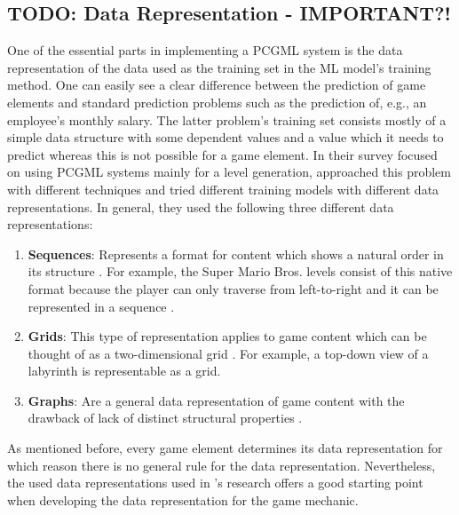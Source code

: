 \documentclass[MGS,Master,english]{twbook}%
\begin{document}
\subsection{TODO: Data Representation - IMPORTANT?!}
{\color{blue}One of the essential parts in implementing a PCGML system is the data representation of the data used as the training set in the ML model's training method. One can easily see a clear difference between the prediction of game elements and standard prediction problems such as the prediction of, e.g., an employee's monthly salary. The latter problem’s training set consists mostly of a simple data structure with some dependent values and a value which it needs to predict whereas this is not possible for a game element. In their survey focused on using PCGML systems mainly for a level generation, \citep{pcgml::paper} approached this problem with different techniques and tried different training models with different data representations. In general, they used the following three different data representations:
\begin{enumerate}
	\item \textbf{Sequences}: Represents a format for content which shows a natural order in its structure \cite{pcgml::paper}. For example, the Super Mario Bros. levels consist of this native format because the player can only traverse from left-to-right and it can be represented in a sequence \cite{pcgml::paper}. 
	\item \textbf{Grids}: This type of representation applies to game content which can be thought of as a two-dimensional grid \cite{pcgml::paper}. For example, a top-down view of a labyrinth is representable as a grid.
	\item \textbf{Graphs}: Are a general data representation of game content with the drawback of lack of distinct structural properties \cite{pcgml::paper}. 
\end{enumerate}
As mentioned before, every game element determines its data representation for which reason there is no general rule for the data representation. Nevertheless, the used data representations used in 's research offers a good starting point when developing the data representation for the game mechanic.}
\end{document}
